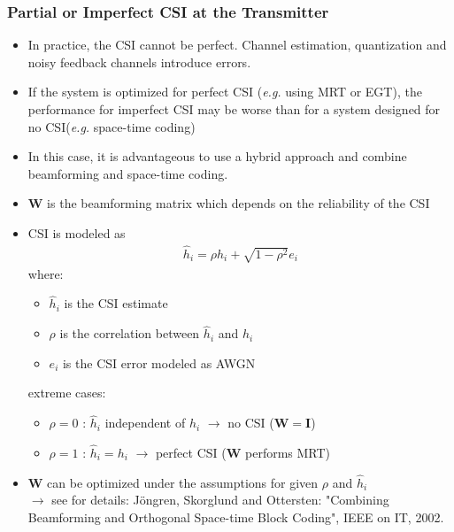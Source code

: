 \documentclass[a4paper, 10pt]{article}
\begin{document}
\subsubsection{Partial or Imperfect CSI at the Transmitter}
\begin{itemize}
	\item In practice, the CSI cannot be perfect. Channel estimation, quantization and noisy feedback channels introduce errors.
	\item If the system is optimized for perfect CSI (\textit{e.g.} using MRT or EGT), the performance for imperfect CSI may be worse than for a system designed for no CSI(\textit{e.g.} space-time coding)
	\item In this case, it is advantageous to use a hybrid approach and combine beamforming and space-time coding.
\end{itemize}
\begin{figure}[h]
	\centering
	
\end{figure}
\begin{itemize}
	\item $\mathbf{W}$ is the beamforming matrix which depends on the reliability of the CSI
	\item CSI is modeled as
	\begin{align*}
	\hat{h}_i=\rho h_i+\sqrt{1-\rho^2}e_i
	\end{align*}
	where:
		\begin{itemize}
			\item $\hat{h}_i$ is the CSI estimate
			\item $\rho$ is the correlation between $\hat{h}_i$ and $h_i$
			\item $e_i$ is the CSI error modeled as AWGN
		\end{itemize}
	extreme cases:
		\begin{itemize}
			\item $\rho = 0$ : $\hat{h}_i$ independent of $h_i$ $\rightarrow$ no CSI ($\mathbf{W}=\mathbf{I}$)
			\item $\rho = 1$ : $\hat{h}_i=h_i$ $\rightarrow$ perfect CSI ($\mathbf{W}$ performs MRT)
		\end{itemize}
	\item $\mathbf{W}$ can be optimized under the assumptions for given $\rho$ and $\hat{h}_i$\\
	$\rightarrow$ see for details: J\"ongren, Skorglund and Ottersten: "Combining Beamforming and Orthogonal Space-time Block Coding", IEEE on IT, 2002.
\end{itemize}
\end{document}
